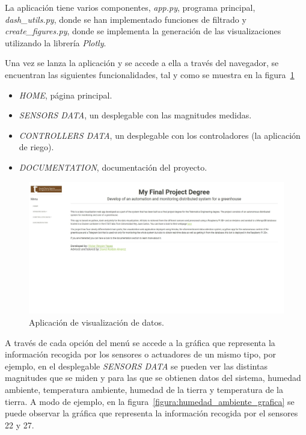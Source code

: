 \documentclass[a4paper, 12pt, oneside]{book}
\begin{document}
La aplicación tiene varios componentes, \textit{app.py}, programa principal, \textit{dash\_utils.py},  donde se han implementado funciones de filtrado y \textit{create\_figures.py}, donde se implementa la generación de las visualizaciones utilizando la librería \textit{Plotly}.

Una vez se lanza la aplicación y se accede a ella a través del navegador, se encuentran las siguientes funcionalidades, tal y como se muestra en la figura~\ref{figura:web}

\begin{itemize}
\item \textit{HOME}, página principal.
\item \textit{SENSORS DATA}, un desplegable con las magnitudes medidas.
\item \textit{CONTROLLERS DATA}, un desplegable con los controladores (la aplicación de riego).
\item \textit{DOCUMENTATION}, documentación del proyecto.
\end{itemize}

\begin{figure}[H]
	\centering
    \includegraphics[width=12cm, keepaspectratio]{img/web}
    \caption{Aplicación de visualización de datos.}
    \label{figura:web}
\end{figure}

A través de cada opción del menú se accede a la gráfica que representa la información recogida por los sensores o actuadores de un mismo tipo, por ejemplo, en el desplegable \textit{SENSORS DATA} se pueden ver las distintas magnitudes que se miden y para las que se obtienen datos del sistema, humedad ambiente, temperatura ambiente, humedad de la tierra y temperatura de la tierra. A modo de ejemplo, en la figura~\ref{figura:humedad_ambiente_grafica} se puede observar la gráfica que representa la información recogida por el sensores 22 y 27.
\end{document}
